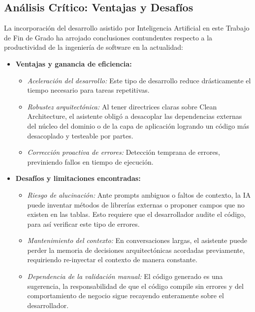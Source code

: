 \subsection{Análisis Crítico: Ventajas y Desafíos}
La incorporación del desarrollo asistido por Inteligencia Artificial en este Trabajo de Fin de Grado ha arrojado conclusiones contundentes respecto a la productividad de la ingeniería de software en la actualidad:

\begin{itemize}
    \item \textbf{Ventajas y ganancia de eficiencia:}
    \begin{itemize}
        \item \textit{Aceleración del desarrollo:} Este tipo de desarrollo reduce drásticamente el tiempo necesario para tareas repetitivas.
        \item \textit{Robustez arquitectónica:} Al tener directrices claras sobre Clean Architecture, el asistente obligó a desacoplar las dependencias externas del núcleo del dominio o de la capa de aplicación logrando un código más desacoplado y testeable por partes.
        \item \textit{Corrección proactiva de errores:} Detección temprana de errores, previniendo fallos en tiempo de ejecución.
    \end{itemize}
    
    \item \textbf{Desafíos y limitaciones encontradas:}
    \begin{itemize}
        \item \textit{Riesgo de alucinación:} Ante prompts ambiguos o faltos de contexto, la IA puede inventar métodos de librerías externas o proponer campos que no existen en las tablas. Esto requiere que el desarrollador audite el código, para así verificar este tipo de errores.
        \item \textit{Mantenimiento del contexto:} En conversaciones largas, el asistente puede perder la memoria de decisiones arquitectónicas acordadas previamente, requiriendo re-inyectar el contexto de manera constante.
        \item \textit{Dependencia de la validación manual:} El código generado es una sugerencia, la responsabilidad de que el código compile sin errores y del comportamiento de negocio sigue recayendo enteramente sobre el desarrollador.
    \end{itemize}
\end{itemize}


